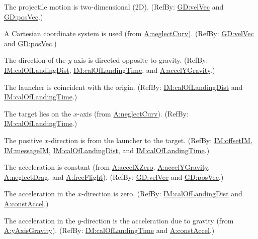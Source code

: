 \documentclass[12pt]{article}
\begin{document}
\begin{description}[font=\normalfont]
\item[twoDMotion:\phantomsection\label{twoDMotion}]{The projectile motion is two-dimensional (2D). (RefBy: \hyperref[GD:velVec]{GD:velVec} and \hyperref[GD:posVec]{GD:posVec}.)}
\item[cartSyst:\phantomsection\label{cartSyst}]{A Cartesian coordinate system is used (from \hyperref[neglectCurv]{A:neglectCurv}). (RefBy: \hyperref[GD:velVec]{GD:velVec} and \hyperref[GD:posVec]{GD:posVec}.)}
\item[yAxisGravity:\phantomsection\label{yAxisGravity}]{The direction of the $y$-axis is directed opposite to gravity. (RefBy: \hyperref[IM:calOfLandingDist]{IM:calOfLandingDist}, \hyperref[IM:calOfLandingTime]{IM:calOfLandingTime}, and \hyperref[accelYGravity]{A:accelYGravity}.)}
\item[launchOrigin:\phantomsection\label{launchOrigin}]{The launcher is coincident with the origin. (RefBy: \hyperref[IM:calOfLandingDist]{IM:calOfLandingDist} and \hyperref[IM:calOfLandingTime]{IM:calOfLandingTime}.)}
\item[targetXAxis:\phantomsection\label{targetXAxis}]{The target lies on the $x$-axis (from \hyperref[neglectCurv]{A:neglectCurv}). (RefBy: \hyperref[IM:calOfLandingTime]{IM:calOfLandingTime}.)}
\item[posXDirection:\phantomsection\label{posXDirection}]{The positive $x$-direction is from the launcher to the target. (RefBy: \hyperref[IM:offsetIM]{IM:offsetIM}, \hyperref[IM:messageIM]{IM:messageIM}, \hyperref[IM:calOfLandingDist]{IM:calOfLandingDist}, and \hyperref[IM:calOfLandingTime]{IM:calOfLandingTime}.)}
\item[constAccel:\phantomsection\label{constAccel}]{The acceleration is constant (from \hyperref[accelXZero]{A:accelXZero}, \hyperref[accelYGravity]{A:accelYGravity}, \hyperref[neglectDrag]{A:neglectDrag}, and \hyperref[freeFlight]{A:freeFlight}). (RefBy: \hyperref[GD:velVec]{GD:velVec} and \hyperref[GD:posVec]{GD:posVec}.)}
\item[accelXZero:\phantomsection\label{accelXZero}]{The acceleration in the $x$-direction is zero. (RefBy: \hyperref[IM:calOfLandingDist]{IM:calOfLandingDist} and \hyperref[constAccel]{A:constAccel}.)}
\item[accelYGravity:\phantomsection\label{accelYGravity}]{The acceleration in the $y$-direction is the acceleration due to gravity (from \hyperref[yAxisGravity]{A:yAxisGravity}). (RefBy: \hyperref[IM:calOfLandingTime]{IM:calOfLandingTime} and \hyperref[constAccel]{A:constAccel}.)}

\end{description}
\end{document}
